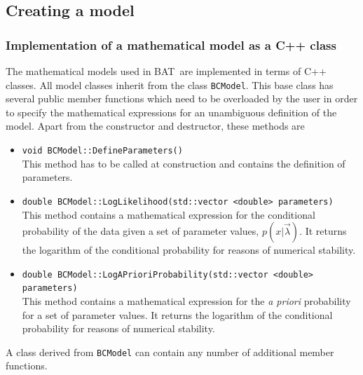 \documentclass[11pt, a4paper]{article}
\newcommand{\bat}{{\sc BAT}}
\begin{document}
\subsection{Creating a model}
\label{subsection:model}


\subsubsection{Implementation of a mathematical model as a C++ class}
\label{subsubsection:implementation}

The mathematical models used in \bat\ are implemented in terms of C++
classes. All model classes inherit from the class \verb|BCModel|. This
base class has several public member functions which need to be
overloaded by the user in order to specify the mathematical
expressions for an unambiguous definition of the model. Apart from the
constructor and destructor, these methods are
%
\begin{itemize}
\item \verb|void BCModel::DefineParameters()| \\
This method has to be called at construction and contains the
definition of parameters.
%
\item
  \verb|double BCModel::LogLikelihood(std::vector <double> parameters)|
  \\ This method contains a mathematical expression for the
  conditional probability of the data given a set of parameter values,
  $p(x|\vec{\lambda})$. It returns the logarithm of the conditional
  probability for reasons of numerical stability.
%
\item
  \verb|double BCModel::LogAPrioriProbability(std::vector <double> parameters)|
  \\ This method contains a mathematical expression for the {\it a
    priori} probability for a set of parameter values. It returns the
  logarithm of the conditional probability for reasons of numerical
  stability.
\end{itemize}

\noindent
A class derived from \verb|BCModel| can contain any number of
additional member functions. \\
\end{document}
